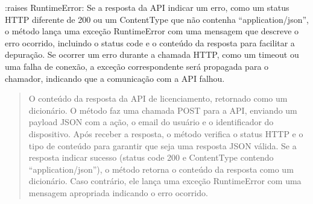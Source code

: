 \documentclass[letterpaper,10pt,english]{sphinxmanual}
\begin{document}
\begin{fulllineitems}
:raises RuntimeError: Se a resposta da API indicar um erro, como um status HTTP diferente de 200 ou um Content\sphinxhyphen{}Type que não contenha “application/json”, o método lança uma exceção RuntimeError com uma mensagem que descreve o erro ocorrido, incluindo o status code e o conteúdo da resposta para facilitar a depuração. Se ocorrer um erro durante a chamada HTTP, como um timeout ou uma falha de conexão, a exceção correspondente será propagada para o chamador, indicando que a comunicação com a API falhou.
\begin{quote}\begin{description}
\sphinxAtStartPar
O conteúdo da resposta da API de licenciamento, retornado como um dicionário. O método faz uma chamada POST para a API, enviando um payload JSON com a ação, o e\sphinxhyphen{}mail do usuário e o identificador do dispositivo. Após receber a resposta, o método verifica o status HTTP e o tipo de conteúdo para garantir que seja uma resposta JSON válida. Se a resposta indicar sucesso (status code 200 e Content\sphinxhyphen{}Type contendo “application/json”), o método retorna o conteúdo da resposta como um dicionário. Caso contrário, ele lança uma exceção RuntimeError com uma mensagem apropriada indicando o erro ocorrido.

\sphinxAtStartPar
{}

\end{description}\end{quote}

\end{fulllineitems}

\end{document}
